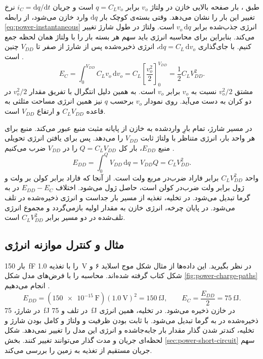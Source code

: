 طبق ، بار صفحه
بالایی خازن در ولتاژ \(v_o\) برابر \(q=C_Lv_o\) است و جریان
\(i_C=\mathrm{d}q/\mathrm{d}t\) نرخ تغییر این بار را نشان می‌دهد.
وقتی بسته‌ی کوچک بار \(\mathrm{d}q\) وارد خازن می‌شود، از رابطه
\eqref{eq:power-instantaneous} انرژی جذب‌شده برابر
\(v_o\,\mathrm{d}q\) است. ولتاژ در طول شارژ تغییر می‌کند. بنابراین
برای محاسبه انرژی باید سهم هر بسته بار را با ولتاژ همان لحظه جمع کنیم.
با جای‌گذاری \(\mathrm{d}q=C_L\,\mathrm{d}v_o\)، انرژی ذخیره‌شده
پس از شارژ از صفر تا \(V_{DD}\) چنین است
\cite[رابطه‌های  و ، صفحات ۱۸۲ و ۱۸۳]{weste}.
\begin{equation}
  E_C=\int_{0}^{V_{DD}} C_Lv_o\,\mathrm{d}v_o
     =C_L\left[\frac{v_o^2}{2}\right]_{0}^{V_{DD}}
     =\frac{1}{2}C_LV_{DD}^2.
  \label{eq:power-capacitor-energy}
\end{equation}
مشتق \(v_o^2/2\) نسبت به \(v_o\) برابر \(v_o\) است. به همین دلیل
انتگرال با تفریق مقدار \(v_o^2/2\) در دو کران به دست می‌آید. روی نمودار
\(v_o\) برحسب \(q\) نیز همین انرژی مساحت مثلثی به قاعده
\(C_LV_{DD}\) و ارتفاع \(V_{DD}\) است.

در مسیر شارژ، تمام بارِ واردشده به خازن از پایانه مثبت منبع عبور
می‌کند. منبع برای هر واحد بار، انرژی متناظر با ولتاژ ثابت \(V_{DD}\)
را می‌دهد. پس برای یافتن انرژی تحویلی منبع \(E_{DD}\)، بار کل
\(Q=C_LV_{DD}\) را در \(V_{DD}\) ضرب می‌کنیم
\cite[رابطه ، صفحه ۱۸۳]{weste}
\cite[اسلایدهای ۳ تا ۵]{powerslides}.
\begin{equation}
  E_{DD}=\int_0^Q V_{DD}\,\mathrm{d}q
        =V_{DD}Q=C_LV_{DD}^2.
  \label{eq:power-source-energy}
\end{equation}
واحد \(C_LV_{DD}^2\) برابر فاراد ضرب‌در مربع ولت است. از آنجا که
فاراد برابر کولن بر ولت و ژول برابر ولت ضرب‌در کولن است، حاصل ژول
می‌شود. اختلاف \(E_{DD}-E_C\) در  به گرما تبدیل می‌شود.
در تخلیه، تغذیه از مسیر بار جداست و انرژی ذخیره‌شده در 
تلف می‌شود. در پایان چرخه، انرژی خازن به مقدار اولیه بازمی‌گردد و
مجموع انرژی تلف‌شده در دو مسیر برابر \(C_LV_{DD}^2\) است.

\subsection{مثال و کنترل موازنه انرژی}
\label{sec:power-cycle-example}

بار \qty{150}{\femto\farad} را با تغذیه \qty{1.0}{\volt} در
نظر بگیرید. این داده‌ها از مثال شکل موج اسلاید ۶ و شکل
 کتاب گرفته شده‌اند. محاسبه را با فرض‌های مدل شکل
\ref{fig:power-charge-paths} انجام می‌دهیم
\cite[اسلاید ۶]{powerslides}\cite[صفحات ۱۸۳ و ۱۸۴]{weste}.
\[
  E_{DD}=(\qty{150e-15}{\farad})(\qty{1.0}{\volt})^2
        =\qty{150}{\femto\joule},
  \qquad
  E_C=\frac{E_{DD}}{2}=\qty{75}{\femto\joule}.
\]
در شارژ، \qty{75}{\femto\joule} در  تلف و
\qty{75}{\femto\joule} در خازن ذخیره می‌شود. در تخلیه، همین انرژی
ذخیره‌شده در  به گرما تبدیل می‌شود. با ثابت بودن ظرفیت و
ولتاژ و کامل بودن شارژ و تخلیه، کندتر شدن گذار مقدار بار جابه‌جاشده و
انرژی این مدل را تغییر نمی‌دهد. شکل لحظه‌ای جریان و مدت گذار می‌توانند
تغییر کنند. بخش \ref{sec:power-short-circuit} سهم جریان مستقیم از
تغذیه به زمین را بررسی می‌کند.
